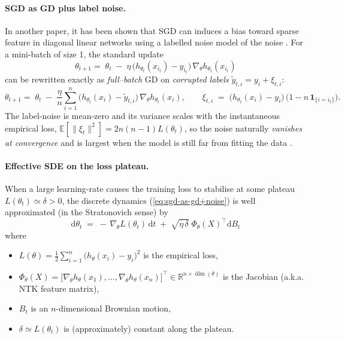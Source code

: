 \documentclass[11pt]{article}
\begin{document}
\paragraph{SGD as GD plus label noise.} In another paper, it has been shown that SGD can induces a bias toward sparse feature in diagonal linear networks using a labelled noise model of the noise \citep{andriushchenko2023sgd}.
For a mini-batch of size 1, the standard update
\begin{equation}
  \theta_{t+1}
  =\;
  \theta_t\;-\;\eta\,
  \bigl(h_{\theta_t}(x_{i_t})-y_{i_t}\bigr)\,
  \nabla_\theta h_{\theta_t}(x_{i_t})
  \label{eq:sgd}
\end{equation}
can be rewritten exactly as \emph{full–batch} GD on \emph{corrupted labels}
$\tilde y_{t,i}=y_i+\xi_{t,i}$:
\begin{equation}
  \theta_{t+1}
  =\;
  \theta_t\;-\;
  \frac{\eta}{n}
  \sum_{i=1}^{n}
  \bigl(h_{\theta_t}(x_i)-\tilde y_{t,i}\bigr)\,
  \nabla_\theta h_{\theta_t}(x_i),
  \qquad
  \xi_{t,i}
  \;=\;
  \bigl(h_{\theta_t}(x_i)-y_i\bigr)\,
  \bigl(1-n\,\mathbf 1_{\{i=i_t\}}\bigr).
  \label{eq:sgd-as-gd+noise}
\end{equation}
The label-noise is mean-zero and its variance scales with the instantaneous empirical loss,
$\mathbb E\!\left[\|\xi_t\|^2\right]=2n(n-1)L(\theta_t)$, so the noise naturally
\emph{vanishes at convergence} and is largest when the model is still far from fitting the data
\citep{lochrie2025sgd}.  \\[-0.6em]

\paragraph{Effective SDE on the loss plateau.}
When a large learning-rate causes the training loss to stabilise at some plateau
$L(\theta_t)\simeq\delta>0$, the discrete dynamics
(\ref{eq:sgd-as-gd+noise}) is well approximated (in the Stratonovich sense) by
\begin{equation}
  \boxed{\;
    \mathrm d\theta_t
    \;=\;
    -\,\nabla_\theta L(\theta_t)\,\mathrm dt
    \;+\;
    \sqrt{\eta\,\delta}\;
      \Phi_\theta(X)^{\!\top}\mathrm dB_t
  \;}
  \label{eq:plateau-sde}
\end{equation}
where

\begin{itemize}\setlength\itemsep{0.2em}
  \item $L(\theta)=\tfrac12\sum_{i=1}^n\bigl(h_\theta(x_i)-y_i\bigr)^2$
        is the empirical loss,
  \item $\Phi_\theta(X)=\bigl[\nabla_\theta h_\theta(x_1),\dots,
        \nabla_\theta h_\theta(x_n)\bigr]^{\!\top}\!\in\mathbb R^{n\times\dim(\theta)}$
        is the Jacobian (a.k.a. NTK feature matrix),
  \item $B_t$ is an $n$-dimensional Brownian motion,
  \item $\delta\simeq L(\theta_t)$ is (approximately) constant along the plateau.
\end{itemize}
\end{document}
